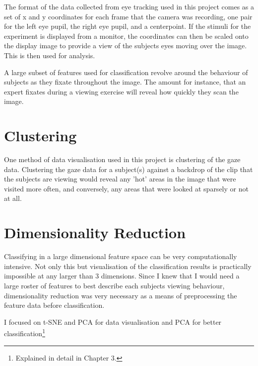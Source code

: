 \documentclass{report}
\begin{document}
{		The format of the data collected from eye tracking used in this project comes as a set of x and y coordinates for each frame that the camera was recording, one pair for the left eye pupil, the right eye pupil, and a centerpoint. If the stimuli for the experiment is displayed from a monitor, the coordinates can then be scaled onto the display image to provide a view of the subjects eyes moving over the image. This is then used for analysis.
		
		A large subset of features used for classification revolve around the behaviour of subjects as they fixate throughout the image. The amount for instance, that an expert fixates during a viewing exercise will reveal how quickly they scan the image.
		
		\section{Clustering}
			One method of data visualisation used in this project is clustering of the gaze data. Clustering the gaze data for a subject(s) against a backdrop of the clip that the subjects are viewing would reveal any 'hot' areas in the image that were visited more often, and conversely, any areas that were looked at sparsely or not at all.
		
		\section{Dimensionality Reduction}
			Classifying in a large dimensional feature space can be very computationally intensive. Not only this but visualisation of the classification results is practically impossible at any larger than 3 dimensions. Since I knew that I would need a large roster of features to best describe each subjects viewing behaviour, dimensionality reduction was very necessary as a means of preprocessing the feature data before classification.
			
			I focused on t-SNE and PCA for data visualisation and PCA for better classification\footnote[1]{Explained in detail in Chapter 3.}
		
}
\end{document}
